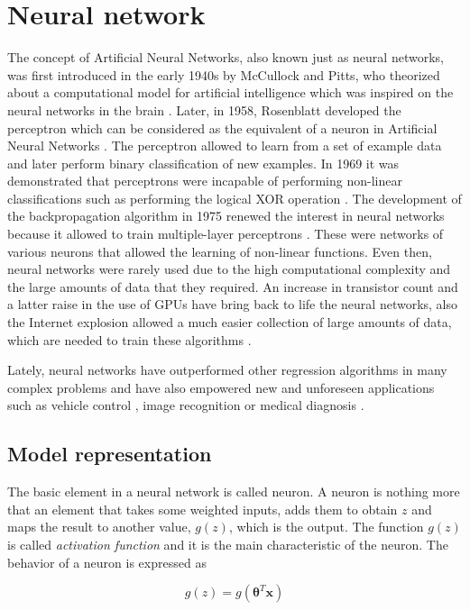 \documentclass[a4paper, report, oneside, UKenglish]{memoir}
\newcommand{\btheta}{\boldsymbol{\theta}}
\begin{document}
\section{Neural network}
The concept of Artificial Neural Networks, also known just as neural networks, was first introduced in the early 1940s by McCullock and Pitts, who theorized about a computational model for artificial intelligence which was inspired on the neural networks in the brain \cite{mcculloch_logical_1943}. Later, in 1958, Rosenblatt developed the perceptron which can be considered as the equivalent of a neuron in Artificial Neural Networks \cite{rosenblatt_perceptron_1958}. The perceptron allowed to learn from a set of example data and later perform binary classification of new examples. In 1969 it was demonstrated that perceptrons were incapable of performing non-linear classifications such as performing the logical XOR operation \cite{minsky69perceptrons}. The development of the backpropagation algorithm in 1975 renewed the interest in neural networks because it allowed to train multiple-layer perceptrons \cite{werbos}. These were networks of various neurons that allowed the learning of non-linear functions. Even then, neural networks were rarely used due to the high computational complexity and the large amounts of data that they required. An increase in transistor count and a latter raise in the use of GPUs have bring back to life the neural networks, also the Internet explosion allowed a much easier collection of large amounts of data, which are needed to train these algorithms \cite{aggarwal_neural_2018}.

Lately, neural networks have outperformed other regression algorithms in many complex problems and have also empowered new and unforeseen applications such as vehicle control \cite{BojarskiTDFFGJM16}, image recognition \cite{hijazi2015} or medical diagnosis \cite{AMATO201347}.

\subsection{Model representation}
The basic element in a neural network is called neuron. A neuron is nothing more that an element that takes some weighted inputs, adds them to obtain $z$ and maps the result to another value, $g(z)$, which is the output. The function $g(z)$ is called \textit{activation function} and it is the main characteristic of the neuron. The behavior of a neuron is expressed as

\begin{equation}
    g(z) = g(\btheta^T\boldsymbol{x})
\end{equation}
\end{document}
